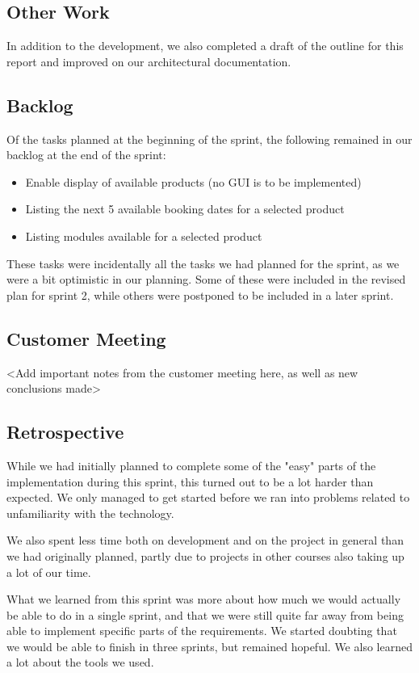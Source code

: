 \subsection{Other Work}
In addition to the development, we also completed a draft of the outline for this report and improved on our architectural documentation.

\subsection{Backlog}
Of the tasks planned at the beginning of the sprint, the following remained in our backlog at the end of the sprint:
\begin{itemize}
	\item Enable display of available products (no GUI is to be implemented)
	\item Listing the next 5 available booking dates for a selected product
	\item Listing modules available for a selected product
\end{itemize}

These tasks were incidentally all the tasks we had planned for the sprint, as we were a bit optimistic in our planning. Some of these were included in the revised plan for sprint 2, while others were postponed to be included in a later sprint.

\subsection{Customer Meeting}
<Add important notes from the customer meeting here, as well as new conclusions made>

\subsection{Retrospective}
While we had initially planned to complete some of the "easy" parts of the implementation during this sprint, this turned out to be a lot harder than expected. We only managed to get started before we ran into problems related to unfamiliarity with the technology.

We also spent less time both on development and on the project in general than we had originally planned, partly due to projects in other courses also taking up a lot of our time.

What we learned from this sprint was more about how much we would actually be able to do in a single sprint, and that we were still quite far away from being able to implement specific parts of the requirements. We started doubting that we would be able to finish in three sprints, but remained hopeful. We also learned a lot about the tools we used.